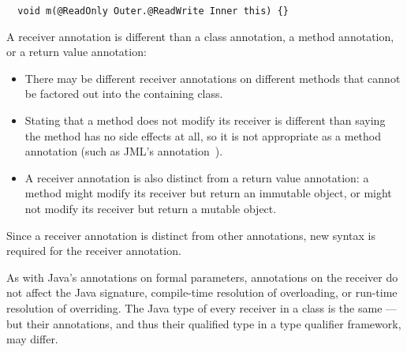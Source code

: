 \documentclass[10pt]{article}
\newcommand{\preverbnegspace}{\vspace{-5pt}}
\begin{document}
\preverbnegspace
\begin{Verbatim}
  void m(@ReadOnly Outer.@ReadWrite Inner this) {}
\end{Verbatim}


A receiver annotation is different than a class annotation, a method
annotation, or a return value annotation:
\begin{itemize}
\item
  There may be different receiver annotations on different methods that
  cannot be factored out into the containing class.

\item
  Stating that a method does not modify its receiver is different than
  saying the method has no side effects at all, so it is not appropriate as
  a method annotation (such as JML's 
  annotation~\cite{LeavensBR2006:JML}).

\item
  A receiver annotation is also distinct from a return value
  annotation:  a method might modify its receiver but return an immutable
  object, or might not modify its receiver but return a mutable object.
\end{itemize}

% 
% 

\noindent
Since a receiver annotation is distinct from other
annotations, new syntax is required for the receiver annotation.



As with Java's annotations on formal parameters, annotations on the
receiver do not affect the Java signature,
compile-time resolution of overloading, or run-time resolution of
overriding.  The Java type of every receiver in a class is the same --- but
their annotations, and thus their qualified type in a type qualifier
framework, may differ.
\end{document}

